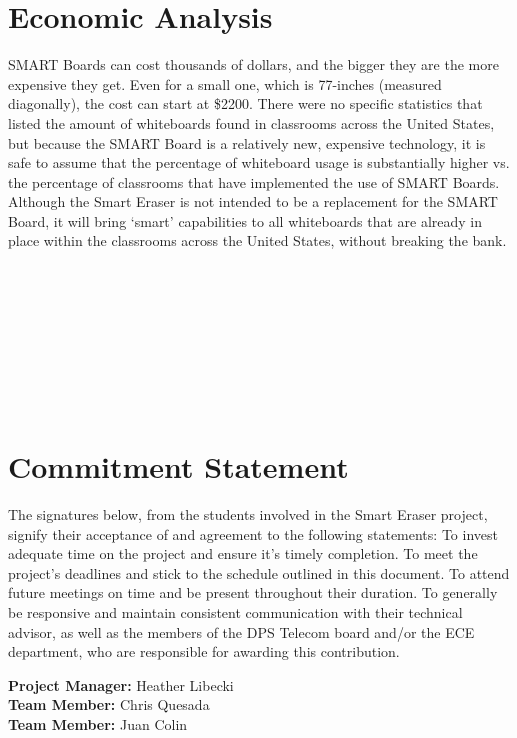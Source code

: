 \documentclass[10pt,onecolumn,draftcls]{IEEEtran} 					%
\begin{document}
	\section{Economic Analysis}
	\setlength{\parindent}{5ex}
	SMART Boards can cost thousands of dollars, and the bigger they are the more expensive they get. Even for a small one, which is 77-inches (measured diagonally), the cost can start at \$2200. There were no specific statistics that listed the amount of whiteboards found in classrooms across the United States, but because the SMART Board is a relatively new, expensive technology, it is safe to assume that the percentage of whiteboard usage is substantially higher vs. the percentage of classrooms that have implemented the use of SMART Boards. Although the Smart Eraser is not intended to be a replacement for the SMART Board, it will bring {\lq}smart{\rq} capabilities to all whiteboards that are already in place within the classrooms across the United States, without breaking the bank.\\\\\\\\\\\\\\\\\\
	\section{Commitment Statement}
	\setlength{\parindent}{5ex}
	The signatures below, from the students involved in the Smart Eraser project, signify their acceptance of and agreement to the following statements:
	To invest adequate time on the project and ensure it{\rq}s timely completion.
	To meet the project{\rq}s deadlines and stick to the schedule outlined in this document.
	To attend future meetings on time and be present throughout their duration.
	To generally be responsive and maintain consistent communication with their technical advisor, as well as the members of the DPS Telecom board and/or the ECE department, who are responsible for awarding this contribution.\\
	\begin{flushleft}
	\textbf{Project Manager:} Heather Libecki			%
	\vspace{12pt}
	\underline{\hspace{3in}}\\					%
	\textbf{Team Member:} Chris Quesada
	\vspace{12pt}
	\underline{\hspace{3in}}\\
	\textbf{Team Member:} Juan Colin
	\vspace{12pt}
	\underline{\hspace{3in}}\\
	\end{flushleft}\par
	\setlength{\parindent}{5ex}
\end{document}
